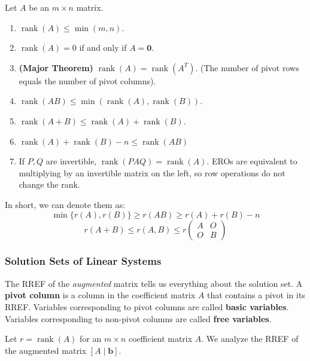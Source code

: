 \documentclass[oneside]{book}
\begin{document}
\begin{property}
Let $A$ be an $m \times n$ matrix.
\begin{enumerate}
    \item $\operatorname{rank}(A) \le \min(m, n)$.
    \item $\operatorname{rank}(A) = 0$ if and only if $A = \mathbf{0}$.
    \item \textbf{(Major Theorem)} $\operatorname{rank}(A) = \operatorname{rank}(A^T)$. (The number of pivot rows equals the number of pivot columns).
    \item $\operatorname{rank}(AB) \le \min(\operatorname{rank}(A), \operatorname{rank}(B))$.
    \item $\operatorname{rank}(A+B) \le \operatorname{rank}(A) + \operatorname{rank}(B)$.
    \item $\operatorname{rank}(A)+\operatorname{rank}(B)-n \le \operatorname{rank}(AB)$
    \item If $P, Q$ are invertible, $\operatorname{rank}(PAQ) = \operatorname{rank}(A)$. EROs are equivalent to multiplying by an invertible matrix on the left, so row operations do not change the rank.
\end{enumerate}
In short, we can denote them as:
\[
\min \{r(A),r(B)\} \geq r(AB) \geq r(A) + r(B) - n
\]
\[
r(A+B) \leq r(A,B) \leq r \begin{pmatrix}
    A & O \\
    O & B
\end{pmatrix}
\]
\end{property}

\subsubsection{Solution Sets of Linear Systems}

The RREF of the \emph{augmented} matrix tells us everything about the solution set.
A \textbf{pivot column} is a column in the coefficient matrix $A$ that contains a pivot in its RREF.
Variables corresponding to pivot columns are called \textbf{basic variables}.
Variables corresponding to non-pivot columns are called \textbf{free variables}.

Let $r = \operatorname{rank}(A)$ for an $m \times n$ coefficient matrix $A$.
We analyze the RREF of the augmented matrix $[A \mid \mathbf{b}]$.
\end{document}
